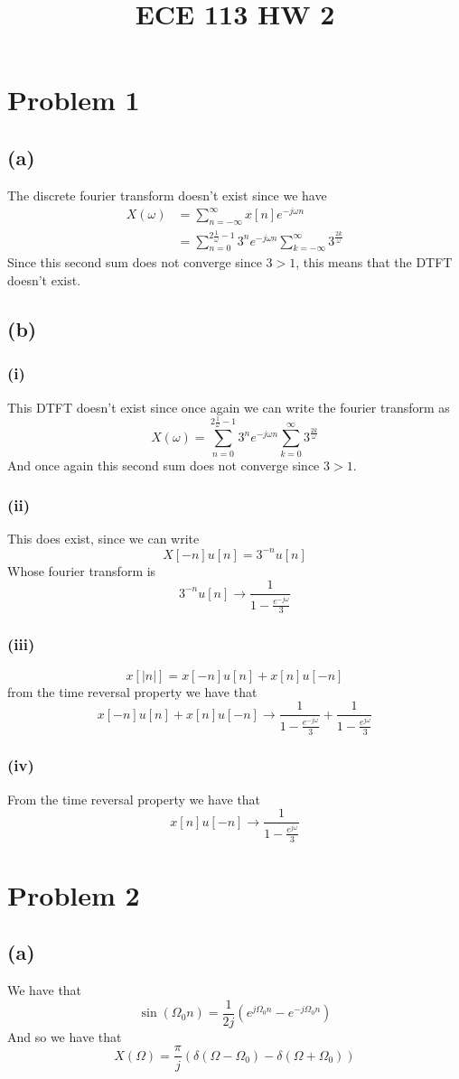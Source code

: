 
\title{ECE 113 HW 2}

\maketitle
\section*{Problem 1}
\subsection*{(a)}
The discrete fourier transform doesn't exist since we have
\begin{align*}
    X(\omega)&=\sum_{n=-\infty}^\infty x[n]e^{-j\omega n}\\
    &=\sum_{n=0}^{2\frac{1}{\omega}-1}3^{n}e^{-j\omega n}\sum_{k=-\infty}^{\infty}3^{\frac{2k}{\omega}}
\end{align*}
Since this second sum does not converge since $3>1$, this means that
the DTFT doesn't exist.
\subsection*{(b)}
\subsubsection*{(i)}
This DTFT doesn't exist since once again we can write the fourier transform
as 
$$X(\omega)=\sum_{n=0}^{2\frac{1}{\omega}-1}3^{n}e^{-j\omega n}\sum_{k=0}^{\infty}3^{\frac{2k}{\omega}}$$
And once again this second sum does not converge since $3>1$.
\subsubsection*{(ii)}
This does exist, since we can write 
$$X[-n]u[n]=3^{-n}u[n]$$
Whose fourier transform is 
$$3^{-n}u[n]\to \frac{1}{1-\frac{e^{-j\omega}}{3}}$$
\subsubsection*{(iii)}
$$x[|n|]=x[-n]u[n]+x[n]u[-n]$$
from the time reversal property we have that
$$x[-n]u[n]+x[n]u[-n]\to \frac{1}{1-\frac{e^{-j\omega}}{3}}+\frac{1}{1-\frac{e^{j\omega}}{3}}$$
\subsubsection*{(iv)}
From the time reversal property we have that
$$x[n]u[-n]\to\frac{1}{1-\frac{e^{j\omega}}{3}}$$
\section*{Problem 2}
\subsection*{(a)}
We have that 
$$\sin(\Omega_0n)=\frac{1}{2j}\left(e^{j\Omega_0n}-e^{-j\Omega_0n}\right)$$
And so we have that 
$$X(\Omega)=\frac{\pi}{j}\left(\delta(\Omega-\Omega_0)-\delta(\Omega+\Omega_0)\right)$$

